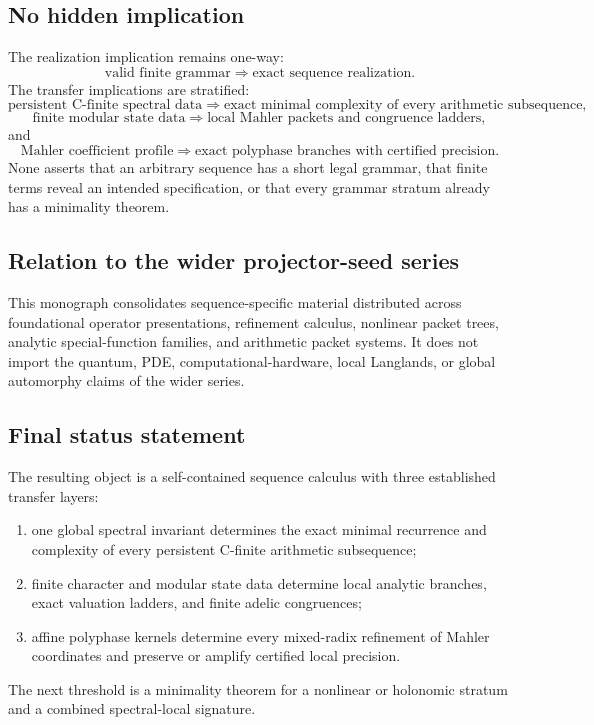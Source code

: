 \documentclass[11pt]{article}
\theoremstyle{definition}\newtheorem{definition}[theorem]{Definition}\newtheorem{example}[theorem]{Example}\newtheorem{construction}[theorem]{Construction}\newtheorem{algorithm}[theorem]{Algorithm}\newtheorem{conjecture}[theorem]{Conjecture}\newtheorem{problem}[theorem]{Problem}
\theoremstyle{remark}\newtheorem{remark}[theorem]{Remark}\newtheorem{boundary}[theorem]{Boundary}\newtheorem{certificate}[theorem]{Computational Certificate}\newtheorem{classical}[theorem]{Classical Input}\newtheorem{principle}[theorem]{Structural Principle}
\begin{document}
\subsection{No hidden implication}
The realization implication remains one-way:
\[
 \text{valid finite grammar}\Longrightarrow\text{exact sequence realization}.
\]
The transfer implications are stratified:
\[
 \text{persistent C-finite spectral data}
 \Longrightarrow
 \text{exact minimal complexity of every arithmetic subsequence},
\]
\[
 \text{finite modular state data}
 \Longrightarrow
 \text{local Mahler packets and congruence ladders},
\]
and
\[
 \text{Mahler coefficient profile}
 \Longrightarrow
 \text{exact polyphase branches with certified precision}.
\]
None asserts that an arbitrary sequence has a short legal grammar, that finite terms reveal an intended specification, or that every grammar stratum already has a minimality theorem.

\subsection{Relation to the wider projector-seed series}
This monograph consolidates sequence-specific material distributed across foundational operator presentations, refinement calculus, nonlinear packet trees, analytic special-function families, and arithmetic packet systems. It does not import the quantum, PDE, computational-hardware, local Langlands, or global automorphy claims of the wider series.

\subsection{Final status statement}
The resulting object is a self-contained sequence calculus with three established transfer layers:
\begin{enumerate}
\item one global spectral invariant determines the exact minimal recurrence and complexity of every persistent C-finite arithmetic subsequence;
\item finite character and modular state data determine local analytic branches, exact valuation ladders, and finite adelic congruences;
\item affine polyphase kernels determine every mixed-radix refinement of Mahler coordinates and preserve or amplify certified local precision.
\end{enumerate}
The next threshold is a minimality theorem for a nonlinear or holonomic stratum and a combined spectral-local signature.

\end{document}

